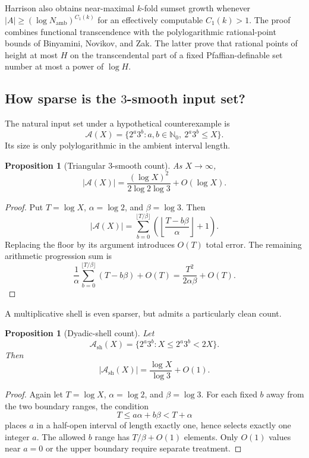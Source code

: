 \documentclass[11pt,oneside]{article}
\newtheorem{proposition}[theorem]{Proposition}
\theoremstyle{definition}
\newcommand{\N}{\mathbb{N}}
\newcommand{\cA}{\mathscr{A}}
\begin{document}
Harrison also obtains near-maximal $k$-fold sumset growth whenever
$|A|\ge(\log N_{\mathrm{amb}})^{C_1(k)}$ for an effectively computable $C_1(k)>1$.  The proof combines functional transcendence with the polylogarithmic rational-point bounds of Binyamini, Novikov, and Zak.  The latter prove that rational points of height at most $H$ on the transcendental part of a fixed Pfaffian-definable set number at most a power of $\log H$.

\subsection{How sparse is the \texorpdfstring{$3$}{3}-smooth input set?}

The natural input set under a hypothetical counterexample is
\[
      \cA(X)=\{2^a3^b:a,b\in\N_0,\ 2^a3^b\le X\}.
\]
Its size is only polylogarithmic in the ambient interval length.

\begin{proposition}[Triangular $3$-smooth count]\label{prop:triangularcount}
As $X\to\infty$,
\[
   |\cA(X)|
   =\frac{(\log X)^2}{2\log2\log3}+O(\log X).
\]
\end{proposition}

\begin{proof}
Put $T=\log X$, $\alpha=\log2$, and $\beta=\log3$.  Then
\[
 |\cA(X)|
 =\sum_{b=0}^{\lfloor T/\beta\rfloor}
   \left(\left\lfloor\frac{T-b\beta}{\alpha}\right\rfloor+1\right).
\]
Replacing the floor by its argument introduces $O(T)$ total error.  The remaining arithmetic progression sum is
\[
 \frac{1}{\alpha}
 \sum_{b=0}^{\lfloor T/\beta\rfloor}(T-b\beta)+O(T)
 =\frac{T^2}{2\alpha\beta}+O(T).
\]
\end{proof}

A multiplicative shell is even sparser, but admits a particularly clean count.

\begin{proposition}[Dyadic-shell count]\label{prop:shellcount}
Let
\[
      \cA_{\mathrm{sh}}(X)=\{2^a3^b:X\le2^a3^b<2X\}.
\]
Then
\[
       |\cA_{\mathrm{sh}}(X)|
       =\frac{\log X}{\log3}+O(1).
\]
\end{proposition}

\begin{proof}
Again let $T=\log X$, $\alpha=\log2$, and $\beta=\log3$.  For each fixed $b$ away from the two boundary ranges, the condition
\[
       T\le a\alpha+b\beta<T+\alpha
\]
places $a$ in a half-open interval of length exactly one, hence selects exactly one integer $a$.  The allowed $b$ range has $T/\beta+O(1)$ elements.  Only $O(1)$ values near $a=0$ or the upper boundary require separate treatment.
\end{proof}
\end{document}
